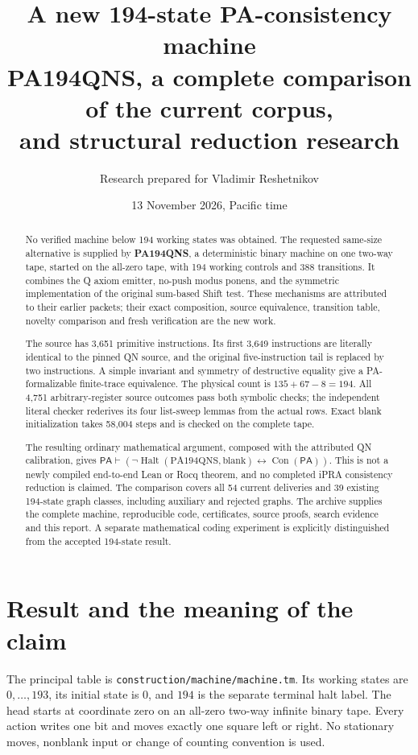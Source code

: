 \documentclass[11pt,letterpaper]{article}
\title{\color{ink}A new 194-state PA-consistency machine\\[5pt]
\large PA194QNS, a complete comparison of the current corpus,\\
and structural reduction research}
\author{Research prepared for Vladimir Reshetnikov}
\date{13 November 2026, Pacific time}
\newcommand{\file}[1]{\nolinkurl{#1}}
\newcommand{\PA}{\mathsf{PA}}
\newcommand{\Con}{\operatorname{Con}}
\newcommand{\Halt}{\operatorname{Halt}}
\begin{document}
\maketitle
\begin{abstract}
No verified machine below 194 working states was obtained. The requested
same-size alternative is supplied by \textbf{PA194QNS}, a deterministic
binary machine on one two-way tape, started on the all-zero tape, with
194 working controls and 388 transitions. It combines the Q axiom emitter,
no-push modus ponens, and the symmetric implementation of the original
sum-based Shift test. These mechanisms are attributed to their earlier
packets; their exact composition, source equivalence, transition table,
novelty comparison and fresh verification are the new work.

The source has 3,651 primitive instructions. Its first 3,649 instructions
are literally identical to the pinned QN source, and the original
five-instruction tail is replaced by two instructions. A simple invariant
and symmetry of destructive equality give a PA-formalizable finite-trace
equivalence. The physical count is $135+67-8=194$. All 4,751 arbitrary-register
source outcomes pass both symbolic checks; the independent literal checker
rederives its four list-sweep lemmas from the actual rows. Exact blank
initialization takes 58,004 steps and is checked on the complete tape.

The resulting ordinary mathematical argument, composed with the attributed
QN calibration, gives
$\PA\vdash(\neg\Halt(\mathrm{PA194QNS},\mathrm{blank})\leftrightarrow
\Con(\PA))$. This is not a newly compiled end-to-end Lean or Rocq theorem,
and no completed iPRA consistency reduction is claimed. The comparison
covers all 54 current deliveries and 39 existing 194-state graph classes,
including auxiliary and rejected graphs. The archive supplies the complete
machine, reproducible code, certificates, source proofs, search evidence and
this report. A separate mathematical coding experiment is explicitly
distinguished from the accepted 194-state result.
\end{abstract}
\clearpage
\tableofcontents
\clearpage

\section{Result and the meaning of the claim}

The principal table is \file{construction/machine/machine.tm}. Its working
states are $0,\ldots,193$, its initial state is $0$, and $194$ is the
separate terminal halt label. The head starts at coordinate zero on an
all-zero two-way infinite binary tape. Every action writes one bit and
moves exactly one square left or right. No stationary moves, nonblank
input or change of counting convention is used.
\end{document}
